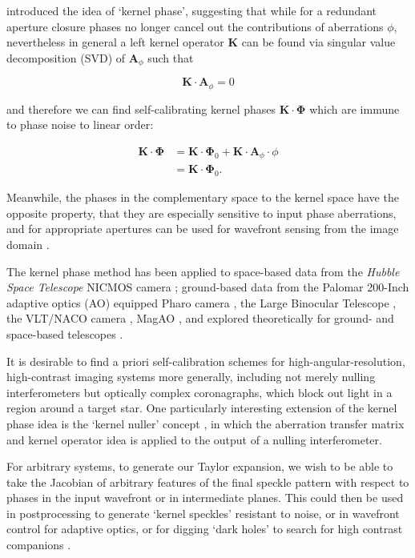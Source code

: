 \documentclass[modern]{aastex63}
\begin{document}
\citet{martinache10} introduced the idea of `kernel phase', suggesting that while for a redundant aperture closure phases no longer cancel out the contributions of aberrations $\phi$, nevertheless in general a left kernel operator $\mathbf{K}$ can be found via singular value decomposition (SVD) of $\mathbf{A}_\phi$ such that

\begin{equation}
        \mathbf{K}\cdot\mathbf{A}_\phi = 0
\end{equation}

\noindent and therefore we can find self-calibrating kernel phases $\mathbf{K}\cdot\mathbf{\Phi}$ which are immune to phase noise to linear order:

\begin{align}
    \mathbf{K}\cdot\mathbf{\Phi} &= \mathbf{K}\cdot\mathbf{\Phi}_0 + \mathbf{K}\cdot\mathbf{A}_\phi\cdot\phi \\
    &= \mathbf{K}\cdot\mathbf{\Phi}_0.
\end{align}

Meanwhile, the phases in the complementary space to the kernel space have the opposite property, that they are especially sensitive to input phase aberrations, and for appropriate apertures can be used for wavefront sensing from the image domain \citep{martinache13,pope14}.

The kernel phase method has been applied to space-based data from the \textit{Hubble Space Telescope} NICMOS camera \citep{pope13,laugier19,martinache20}; ground-based data from the Palomar 200-Inch adaptive optics (AO) equipped Pharo camera \citep{palomar,martinache20}, the Large Binocular Telescope \citep{sallum15}, the VLT/NACO camera \citep{kammerer19}, MagAO \citep{sallum19b}, and explored theoretically for ground- and space-based telescopes \citep{ireland13,martinache11,sallum19a,ceau19}.

It is desirable to find a priori self-calibration schemes for high-angular-resolution, high-contrast imaging systems more generally, including not merely nulling interferometers but optically complex coronagraphs, which block out light in a region around a target star. One particularly interesting extension of the kernel phase idea is the `kernel nuller' concept \citep{martinache18}, in which the aberration transfer matrix and kernel operator idea is applied to the output of a nulling interferometer. 

For arbitrary systems, to generate our Taylor expansion, we wish to be able to take the Jacobian of arbitrary features of the final speckle pattern with respect to phases in the input wavefront or in intermediate planes. This could then be used in postprocessing to generate `kernel speckles' resistant to noise, or in wavefront control for adaptive optics, or for digging `dark holes' to search for high contrast companions \citep{malbet95}.
\end{document}
